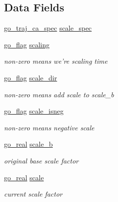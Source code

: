 \subsection*{Data Fields}
\begin{DoxyCompactItemize}
\item 
\hyperlink{structgomotion_1_1go__traj__ca__spec}{go\-\_\-traj\-\_\-ca\-\_\-spec} \hyperlink{structgomotion_1_1go__scale__spec_a09627b5c232ccc27aa4a9876c7fd6edb}{scale\-\_\-spec}
\item 
\hyperlink{gotypes_8h_ae890d9a0ddecc0d3073622cc4312092d}{go\-\_\-flag} \hyperlink{structgomotion_1_1go__scale__spec_ab692a7752aa08649020c990b4bea3c84}{scaling}
\begin{DoxyCompactList}\small\item\em non-\/zero means we're scaling time \end{DoxyCompactList}\item 
\hyperlink{gotypes_8h_ae890d9a0ddecc0d3073622cc4312092d}{go\-\_\-flag} \hyperlink{structgomotion_1_1go__scale__spec_af13cc2a23a17aba5aae5fbafc47a8428}{scale\-\_\-dir}
\begin{DoxyCompactList}\small\item\em non-\/zero means add scale to scale\-\_\-b \end{DoxyCompactList}\item 
\hyperlink{gotypes_8h_ae890d9a0ddecc0d3073622cc4312092d}{go\-\_\-flag} \hyperlink{structgomotion_1_1go__scale__spec_abd719098dc45e827d7349e8eb682f2c2}{scale\-\_\-isneg}
\begin{DoxyCompactList}\small\item\em non-\/zero means negative scale \end{DoxyCompactList}\item 
\hyperlink{gotypes_8h_afd666a2393eebd71ee455846ac9def9b}{go\-\_\-real} \hyperlink{structgomotion_1_1go__scale__spec_ac734b7e45bc1da45992fdf6f1fdc792d}{scale\-\_\-b}
\begin{DoxyCompactList}\small\item\em original base scale factor \end{DoxyCompactList}\item 
\hyperlink{gotypes_8h_afd666a2393eebd71ee455846ac9def9b}{go\-\_\-real} \hyperlink{structgomotion_1_1go__scale__spec_a592f5bd1c5d775d30e25b798900a2c30}{scale}
\begin{DoxyCompactList}\small\item\em current scale factor \end{DoxyCompactList}\item 

\end{DoxyCompactItemize}
